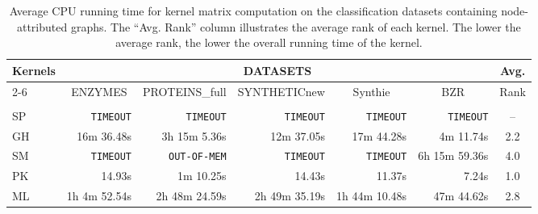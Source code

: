 \documentclass[twoside,11pt]{article}
\begin{document}
\begin{table}[t]
\centering
\scriptsize
\def\arraystretch{1.1}
\begin{tabular}{lrrrrrc} \toprule
\multirow{3}{*}{Kernels} & \multicolumn{5}{c}{DATASETS} & \multirow{2}{*}{Avg.} \\ \cline{2-6}
& \multicolumn{1}{c}{\multirow{2}{*}{ENZYMES}} & \multicolumn{1}{c}{\multirow{2}{*}{PROTEINS\_full}} & \multicolumn{1}{c}{\multirow{2}{*}{SYNTHETICnew}} & \multicolumn{1}{c}{\multirow{2}{*}{Synthie}} & \multicolumn{1}{c}{\multirow{2}{*}{BZR}} & \multirow{2}{*}{Rank} \\ 
& & & & & \\ 
\midrule
SP & \texttt{TIMEOUT} & \texttt{TIMEOUT} & \texttt{TIMEOUT} & \texttt{TIMEOUT} & \texttt{TIMEOUT} & -- \\
GH & 16m 36.48s & 3h 15m 5.36s & 12m 37.05s & 17m 44.28s & 4m 11.74s & 2.2 \\ 
SM & \texttt{TIMEOUT} & \texttt{OUT-OF-MEM} & \texttt{TIMEOUT} & \texttt{TIMEOUT} & 6h 15m 59.36s & 4.0 \\ 
PK & 14.93s & 1m 10.25s & 14.43s & 11.37s & 7.24s & 1.0 \\ 
ML & 1h 4m 52.54s & 2h 48m 24.59s & 2h 49m 35.19s & 1h 44m 10.48s & 47m 44.62s & 2.8 \\ 
\bottomrule
\end{tabular}
\caption{Average CPU running time for kernel matrix computation on the  classification datasets containing node-attributed graphs. The ``Avg. Rank'' column illustrates the average rank of each kernel. The lower the average rank, the lower the overall running time of the kernel.}
\label{tab:runtimes_attributed}
\end{table}
\end{document}
